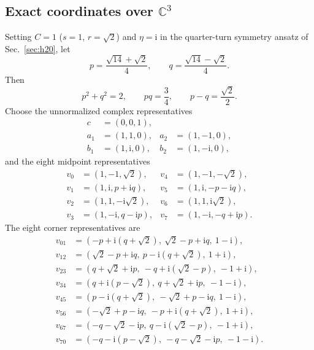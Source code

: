 \documentclass[twocolumn,aps,pra,floatfix,amsmath,amssymb,longbibliography]{revtex4-2}
\theoremstyle{definition}
\theoremstyle{remark}
\newcommand{\ii}{\mathrm{i}}
\newcommand{\C}{\mathbb C}
\begin{document}
\subsection{Exact coordinates over \texorpdfstring{$\C^3$}{C3}}

Setting $C=1$ ($s=1$, $r=\sqrt2$) and $\eta=\ii$ in the quarter-turn
symmetry ansatz of Sec.~\ref{sec:h20}, let
\begin{equation}
 p=\frac{\sqrt{14}+\sqrt2}{4},\qquad
 q=\frac{\sqrt{14}-\sqrt2}{4}.
 \label{eq:pq}
\end{equation}
Then
\begin{equation}
 p^2+q^2=2,\qquad pq=\frac34,\qquad p-q=\frac{\sqrt2}{2}.
 \label{eq:pq-identities}
\end{equation}
Choose the unnormalized complex representatives
\begin{align}
 c&=(0,0,1),\nonumber\\
 a_1&=(1,1,0),&a_2&=(1,-1,0),\nonumber\\
 b_1&=(1,\ii,0),&b_2&=(1,-\ii,0),
 \label{eq:h21-inner}
\end{align}
and the eight midpoint representatives
\begin{align}
 v_0&=(1,-1,\sqrt2),&v_4&=(1,-1,-\sqrt2),\nonumber\\
 v_1&=(1,\ii,p+\ii q),&v_5&=(1,\ii,-p-\ii q),\nonumber\\
 v_2&=(1,1,-\ii\sqrt2),&v_6&=(1,1,\ii\sqrt2),\nonumber\\
 v_3&=(1,-\ii,q-\ii p),&v_7&=(1,-\ii,-q+\ii p).
 \label{eq:h21-midpoints}
\end{align}
The eight corner representatives are
\begin{align}
 v_{01}&=(-p+\ii(q+\sqrt2),\ \sqrt2-p+\ii q,\ 1-\ii),\nonumber\\
 v_{12}&=(\sqrt2-p+\ii q,\ p-\ii(q+\sqrt2),\ 1+\ii),\nonumber\\
 v_{23}&=(q+\sqrt2+\ii p,\ -q+\ii(\sqrt2-p),\ -1+\ii),\nonumber\\
 v_{34}&=(q+\ii(p-\sqrt2),\ q+\sqrt2+\ii p,\ -1-\ii),\nonumber\\
 v_{45}&=(p-\ii(q+\sqrt2),\ -\sqrt2+p-\ii q,\ 1-\ii),\nonumber\\
 v_{56}&=(-\sqrt2+p-\ii q,\ -p+\ii(q+\sqrt2),\ 1+\ii),\nonumber\\
 v_{67}&=(-q-\sqrt2-\ii p,\ q-\ii(\sqrt2-p),\ -1+\ii),\nonumber\\
 v_{70}&=(-q-\ii(p-\sqrt2),\ -q-\sqrt2-\ii p,\ -1-\ii).
 \label{eq:h21-corners}
\end{align}
\end{document}
